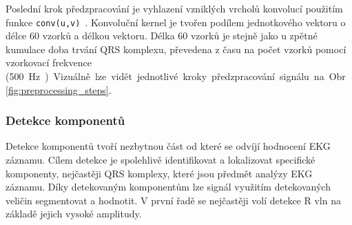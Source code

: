 Poslední krok předzpracování je vyhlazení vzniklých vrcholů konvolucí použitím
funkce \texttt{conv(u,v)}~\cite{matlabCONV}. Konvoluční kernel je tvořen podílem
jednotkového vektoru o délce 60 vzorků a délkou vektoru. Délka 60 vzorků je
stejně jako u zpětné kumulace doba trvání QRS komplexu, převedena z času na
počet vzorků pomocí vzorkovací frekvence (500~\si\Hz). Vizuálně lze vidět
jednotlivé kroky předzpracování signálu na Obr.~\ref{fig:preprocessing_steps}.

\subsubsection{Detekce komponentů}
\label{section:components_detection}
Detekce komponentů tvoří nezbytnou část od které se odvíjí hodnocení EKG
záznamu. Cílem detekce je spolehlivě identifikovat a lokalizovat specifické
komponenty, nejčastěji QRS komplexy, které jsou předmět analýzy EKG záznamu.
Díky detekovaným komponentům lze signál využitím detekovaných veličin
segmentovat a hodnotit. V první řadě se nejčastěji volí detekce R vln na základě
jejich vysoké amplitudy.

